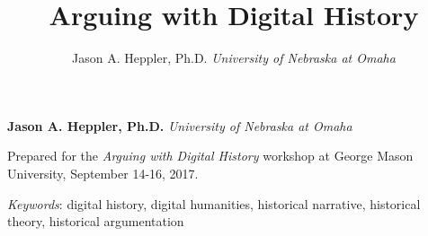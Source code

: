 \documentclass[11pt,]{article}
\title{Arguing with Digital History  }
\author{\Large Jason A. Heppler, Ph.D.\vspace{0.05in} \newline\normalsize\emph{University of Nebraska at Omaha}  }
\date{}
\newcommand*{\authorfont}{\fontfamily{phv}\selectfont}
\renewenvironment{abstract}
 {{%
    \setlength{\leftmargin}{0mm}
    \setlength{\rightmargin}{\leftmargin}%
  }%
  \relax}
 {\endlist}
\begin{document}
	
%

{%
\setlength{\parindent}{0pt}
\thispagestyle{plain}
{\fontsize{18}{20}\selectfont\raggedright 
\maketitle  %

}

{
   \vskip 13.5pt\relax \normalsize\fontsize{11}{12} 
\textbf{\authorfont Jason A. Heppler, Ph.D.} \hskip 15pt \emph{\small University of Nebraska at Omaha}   

}

}







\begin{abstract}

    \hbox{\vrule height .2pt width 39.14pc}

    \vskip 8.5pt %

\noindent Prepared for the \emph{Arguing with Digital History} workshop at George
Mason University, September 14-16, 2017.


\vskip 8.5pt \noindent \emph{Keywords}: digital history, digital humanities, historical narrative, historical
theory, historical argumentation \par

    \hbox{\vrule height .2pt width 39.14pc}



\end{abstract}


\vskip 6.5pt
\end{document}
